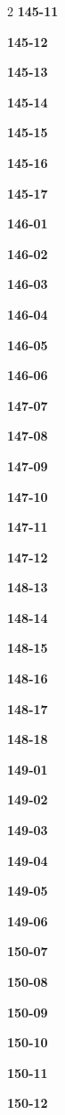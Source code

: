\documentclass[10pt,a4paper]{article}
\begin{document}
\begin{multicols}{2}
\noindent\textbf{145-11}\ \par
\noindent\textbf{145-12}\ \par
\noindent\textbf{145-13}\ \par
\noindent\textbf{145-14}\ \par
\noindent\textbf{145-15}\ \par
\noindent\textbf{145-16}\ \par
\noindent\textbf{145-17}\ \par
\noindent\textbf{146-01}\ \par
\noindent\textbf{146-02}\ \par
\noindent\textbf{146-03}\ \par
\noindent\textbf{146-04}\ \par
\noindent\textbf{146-05}\ \par
\noindent\textbf{146-06}\ \par
\noindent\textbf{147-07}\ \par
\noindent\textbf{147-08}\ \par
\noindent\textbf{147-09}\ \par
\noindent\textbf{147-10}\ \par
\noindent\textbf{147-11}\ \par
\noindent\textbf{147-12}\ \par
\noindent\textbf{148-13}\ \par
\noindent\textbf{148-14}\ \par
\noindent\textbf{148-15}\ \par
\noindent\textbf{148-16}\ \par
\noindent\textbf{148-17}\ \par
\noindent\textbf{148-18}\ \par
\noindent\textbf{149-01}\ \par
\noindent\textbf{149-02}\ \par
\noindent\textbf{149-03}\ \par
\noindent\textbf{149-04}\ \par
\noindent\textbf{149-05}\ \par
\noindent\textbf{149-06}\ \par
\noindent\textbf{150-07}\ \par
\noindent\textbf{150-08}\ \par
\noindent\textbf{150-09}\ \par
\noindent\textbf{150-10}\ \par
\noindent\textbf{150-11}\ \par
\noindent\textbf{150-12}\ \par

\end{multicols}
\end{document}
